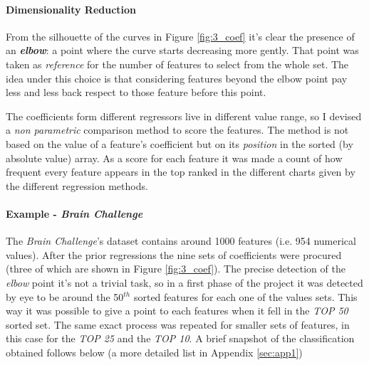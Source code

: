 \documentclass{article}
\begin{document}
\paragraph{Dimensionality Reduction}

From the silhouette of the curves in Figure \ref{fig:3_coef} it's clear the presence of an \textbf{\emph{elbow}}: a point where the curve starts decreasing more gently. That point was taken as \emph{reference} for the number of features to select from the whole set. The idea under this choice is that considering features beyond the elbow point pay less and less back respect to those feature before this point.

The coefficients form different regressors live in different value range, so I devised a \emph{non parametric} comparison method to score the features. The method is not based on the value of a feature's coefficient but on its \emph{position} in the sorted (by absolute value) array. As a score for each feature it was made a count of how frequent every feature appears in the top ranked in the different charts given by the different regression methods.

\paragraph{Example - \emph{Brain Challenge}}
The \emph{Brain Challenge}'s dataset contains around 1000 features (i.e. 954 numerical values). After the prior regressions the nine sets of coefficients were procured (three of which are shown in Figure \ref{fig:3_coef}). The precise detection of the \emph{elbow} point it's not a trivial task, so in a first phase of the project it was detected by eye to be around the 50$^{th}$ sorted features for each one of the values sets. This way it was possible to give a point to each features when it fell in the \emph{TOP 50} sorted set. The same exact process was repeated for smaller sets of features, in this case for the \emph{TOP 25} and the \emph{TOP 10}. A brief snapshot of the classification obtained follows below (a more detailed list in  Appendix \ref{sec:app1})
\end{document}
